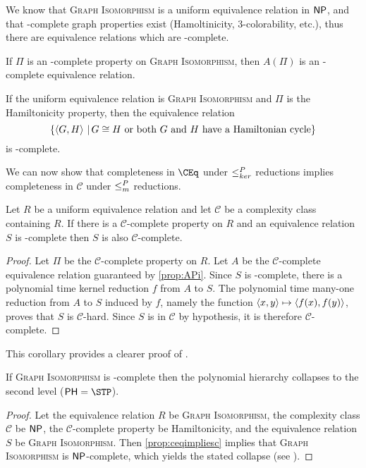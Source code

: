We know that \textsc{Graph Isomorphism} is a uniform equivalence relation in ${\mathsf{NP}}$, and that \NP-complete graph properties exist (Hamoltinicity, 3-colorability, etc.), thus there are equivalence relations which are \NP-complete.

\begin{corollary}\label{cor:npcompleteeqrel}
  If $\Pi$ is an \NP-complete property on \textsc{Graph Isomorphism}, then $A(\Pi)$ is an \NP-complete equivalence relation.
\end{corollary}

\begin{example}
  If the uniform equivalence relation is \textsc{Graph Isomorphism} and $\Pi$ is the Hamiltonicity property, then the equivalence relation
  \begin{equation*}
    \{ \left\langle G,H\right\rangle \, | \, G \cong H \text{ or both } G \text{ and } H \text{ have a Hamiltonian cycle}  \}
  \end{equation*}
  is \NP-complete.
\end{example}

We can now show that completeness in $\CEq$ under $\leq^{P}_{ker}$ reductions implies completeness in $\mathcal{C}$ under $\leq^{P}_{m}$ reductions.

\begin{proposition}\label{prop:ceqimpliesc}
  Let $R$ be a uniform equivalence relation and let $\mathcal{C}$ be a complexity class containing $R$.
  If there is a $\mathcal{C}$-complete property on $R$ and an equivalence relation $S$ is \CEq-complete then $S$ is also $\mathcal{C}$-complete.
\end{proposition}
\begin{proof}
  Let $\Pi$ be the $\mathcal{C}$-complete property on $R$.
  Let $A$ be the $\mathcal{C}$-complete equivalence relation guaranteed by \autoref{prop:APi}.
  Since $S$ is \CEq-complete, there is a polynomial time kernel reduction $f$ from $A$ to $S$.
  The polynomial time many-one reduction from $A$ to $S$ induced by $f$, namely the function $\left\langle x,y\right\rangle \mapsto \left\langle f(x),f(y)\right\rangle$, proves that $S$ is $\mathcal{C}$-hard.
  Since $S$ is in $\mathcal{C}$ by hypothesis, it is therefore $\mathcal{C}$-complete.
\end{proof}

This corollary provides a clearer proof of \autocite[Proposition~8.1]{bcffm}.

\begin{corollary}
  If \textsc{Graph Isomorphism} is \NPEq-complete then the polynomial hierarchy collapses to the second level ($\PH = \STP$).
\end{corollary}
\begin{proof}
  Let the equivalence relation $R$ be \textsc{Graph Isomorphism}, the complexity class $\mathcal{C}$ be ${\mathsf{NP}}$, the $\mathcal{C}$-complete property be Hamiltonicity, and the equivalence relation $S$ be \textsc{Graph Isomorphism}.
  Then \autoref{prop:ceqimpliesc} implies that \textsc{Graph Isomorphism} is ${\mathsf{NP}}$-complete, which yields the stated collapse (see \autocite{schoning87}).
\end{proof}

